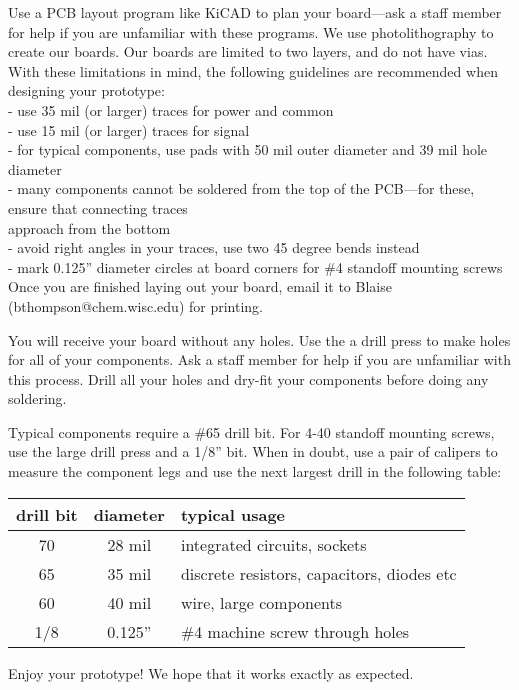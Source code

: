 \documentclass{training}
\begin{document}
Use a PCB layout program like KiCAD to plan your board---ask a staff member for help if you are unfamiliar with these programs.
We use photolithography to create our boards.
Our boards are limited to two layers, and do not have vias.
With these limitations in mind, the following guidelines are recommended when designing your prototype: \\
- use 35 mil (or larger) traces for power and common \\
- use 15 mil (or larger) traces for signal \\
- for typical components, use pads with 50 mil outer diameter and 39 mil hole diameter \\
- many components cannot be soldered from the top of the PCB---for these, ensure that connecting traces \\ \phantom{-} approach from the bottom \\
- avoid right angles in your traces, use two 45 degree bends instead \\
- mark 0.125'' diameter circles at board corners for \#4 standoff mounting screws \\
Once you are finished laying out your board, email it to Blaise (bthompson@chem.wisc.edu) for printing.

You will receive your board without any holes.
Use the a drill press to make holes for all of your components.
Ask a staff member for help if you are unfamiliar with this process.
Drill all your holes and dry-fit your components before doing any soldering.

Typical components require a \#65 drill bit.
For 4-40 standoff mounting screws, use the large drill press and a 1/8'' bit.
When in doubt, use a pair of calipers to measure the component legs and use the next largest drill in the following table:

\begin{center}
\begin{tabular}{c | c | l}
  drill bit & diameter & typical usage \\ \hline
  70 & 28 mil & integrated circuits, sockets \\
  65 & 35 mil & discrete resistors, capacitors, diodes etc \\
  60 & 40 mil & wire, large components \\
  1/8 & 0.125'' & \#4 machine screw through holes
\end{tabular}
\end{center}

Enjoy your prototype!
We hope that it works exactly as expected.
\end{document}
